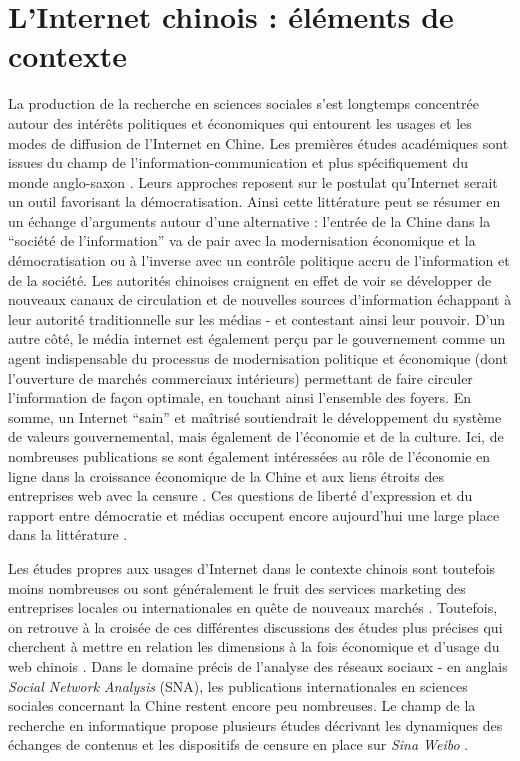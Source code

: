 \section{L’Internet chinois : éléments de contexte }
\label{sec:internet-chine}
La production de la recherche en sciences sociales s'est longtemps concentrée autour des intérêts politiques et économiques qui entourent les usages et les modes de diffusion de l’Internet en Chine. Les premières études académiques sont issues du champ de l’information-communication et plus spécifiquement du monde anglo-saxon \citep{Johnson1996,Qiu2005}. Leurs approches reposent sur le postulat qu'Internet serait un outil favorisant la démocratisation. Ainsi cette littérature peut se résumer en un échange d'arguments autour d'une alternative : l'entrée de la Chine dans la ``société de l'information'' va de pair avec la modernisation économique et la démocratisation ou à l’inverse avec un contrôle politique accru de l'information et de la société. Les autorités chinoises craignent en effet de voir se développer de nouveaux canaux de circulation et de nouvelles sources d'information échappant à leur autorité traditionnelle sur les médias - et contestant ainsi leur pouvoir. D'un autre côté, le média internet est également perçu par le gouvernement comme un agent indispensable du processus de modernisation politique et économique (dont l’ouverture de marchés commerciaux intérieurs) permettant de faire circuler l’information de façon optimale, en touchant ainsi l’ensemble des foyers. En somme, un Internet ``sain'' et maîtrisé soutiendrait le développement du système de valeurs gouvernemental, mais également de l’économie et de la culture. Ici, de nombreuses publications se sont également intéressées au rôle de l’économie en ligne dans la croissance économique de la Chine et aux liens étroits des entreprises web avec la censure \citep{Dann2008}. Ces questions de liberté d’expression et du rapport entre démocratie et médias occupent encore aujourd’hui une large place dans la littérature \citep{MacKinnon2009, Douzet2007, Yang2008}.

Les études propres aux usages d’Internet dans le contexte chinois sont toutefois moins nombreuses ou sont généralement le fruit des services marketing des entreprises locales ou internationales en quête de nouveaux marchés \citep{Hwang2005, Bergstrom2012}. Toutefois, on retrouve à la croisée de ces différentes discussions des études plus précises qui cherchent à mettre en relation les dimensions à la fois économique et d’usage du web chinois \citep{Puel2009, Fernandez2010}. Dans le domaine précis de l’analyse des réseaux sociaux - en anglais \textit{Social Network Analysis} (SNA), les publications internationales en sciences sociales concernant la Chine restent encore peu nombreuses. Le champ de la recherche en informatique propose plusieurs études décrivant les dynamiques des échanges de contenus \citep{Yu2011} et les dispositifs de censure en place sur \textit{Sina Weibo} \citep{Bamman2012}. 

